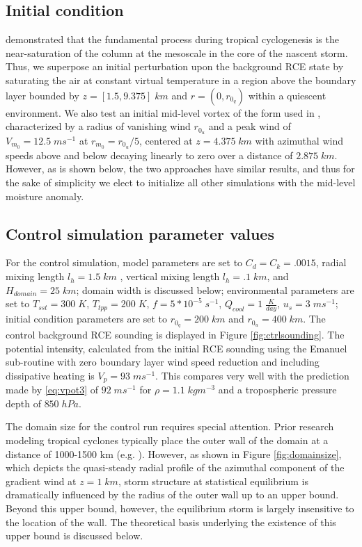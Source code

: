 \documentclass[12pt]{article}
\begin{document}
\subsection{Initial condition}
\cite{Bister_Emanuel_1997} demonstrated that the fundamental process during tropical cyclogenesis is the near-saturation of the column at the mesoscale in the core of the nascent storm. Thus, we superpose an initial perturbation upon the background RCE state by saturating the air at constant virtual temperature in a region above the boundary layer bounded by $z = [1.5, 9.375] \; km$ and $r = (0, r_{0_q})$ within a quiescent environment.  We also test an initial mid-level vortex of the form used in \cite{Rotunno_Emanuel_1987}, characterized by a radius of vanishing wind $r_{0_u}$ and a peak wind of $V_{m_0} = 12.5 \; ms^{-1}$ at $r_{m_0} = r_{0_u} / 5$, centered at $z=4.375 \; km$ with azimuthal wind speeds above and below decaying linearly to zero over a distance of $2.875 \; km$. However, as is shown below, the two approaches have similar results, and thus for the sake of simplicity we elect to initialize all other simulations with the mid-level moisture anomaly.

\subsection{Control simulation parameter values}
For the control simulation, model parameters are set to $C_d = C_k = .0015$, radial mixing length $l_h = 1.5 \; km$ \citep{Bryan_Rotunno_2009b}, vertical mixing length $l_h = .1 \; km$, and $H_{domain} = 25 \; km$; domain width is discussed below; environmental parameters are set to $T_{sst} = 300 \; K$, $T_{tpp} = 200 \; K$, $f = 5*10^{-5} \; s^{-1}$, $Q_{cool} = 1 \; \frac{K}{day}$, $u_s = 3 \; ms^{-1}$; initial condition parameters are set to $r_{0_q} = 200 \; km$ and $r_{0_u} = 400 \; km$. The control background RCE sounding is displayed in Figure \ref{fig:ctrlsounding}. The potential intensity, calculated from the initial RCE sounding using the Emanuel sub-routine with zero boundary layer wind speed reduction and including dissipative heating is $V_p = 93 \; ms^{-1}$.  This compares very well with the prediction made by \eqref{eq:vpot3} of $92 \; ms^{-1}$ for $\rho =  1.1 \; kgm^{-3}$ and a tropospheric pressure depth of $850 \; hPa$.


The domain size for the control run requires special attention. Prior research modeling tropical cyclones typically place the outer wall of the domain at a distance of 1000-1500 km (e.g. \cite{Rotunno_Emanuel_1987, Hakim_2011}).  However, as shown in Figure \ref{fig:domainsize}, which depicts the quasi-steady radial profile of the azimuthal component of the gradient wind at $z = 1 \; km$, storm structure at statistical equilibrium is dramatically influenced by the radius of the outer wall up to an upper bound. Beyond this upper bound, however, the equilibrium storm is largely insensitive to the location of the wall. The theoretical basis underlying the existence of this upper bound is discussed below.
\end{document}
